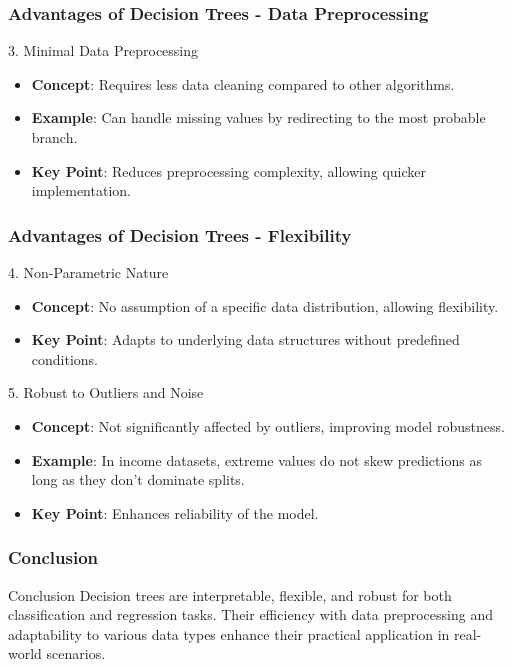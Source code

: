 \documentclass[aspectratio=169]{beamer}
\begin{document}
\begin{frame}[fragile]
    \frametitle{Advantages of Decision Trees - Data Preprocessing}
    \begin{block}{3. Minimal Data Preprocessing}
        \begin{itemize}
            \item \textbf{Concept}: Requires less data cleaning compared to other algorithms.
            \item \textbf{Example}: Can handle missing values by redirecting to the most probable branch.
            \item \textbf{Key Point}: Reduces preprocessing complexity, allowing quicker implementation.
        \end{itemize}
    \end{block}
\end{frame}

\begin{frame}[fragile]
    \frametitle{Advantages of Decision Trees - Flexibility}
    \begin{block}{4. Non-Parametric Nature}
        \begin{itemize}
            \item \textbf{Concept}: No assumption of a specific data distribution, allowing flexibility.
            \item \textbf{Key Point}: Adapts to underlying data structures without predefined conditions.
        \end{itemize}
    \end{block}
    
    \begin{block}{5. Robust to Outliers and Noise}
        \begin{itemize}
            \item \textbf{Concept}: Not significantly affected by outliers, improving model robustness.
            \item \textbf{Example}: In income datasets, extreme values do not skew predictions as long as they don't dominate splits.
            \item \textbf{Key Point}: Enhances reliability of the model.
        \end{itemize}
    \end{block}
\end{frame}

\begin{frame}[fragile]
    \frametitle{Conclusion}
    \begin{block}{Conclusion}
        Decision trees are interpretable, flexible, and robust for both classification and regression tasks. 
        Their efficiency with data preprocessing and adaptability to various data types enhance their practical application in real-world scenarios.
    \end{block}
\end{frame}
\end{document}
